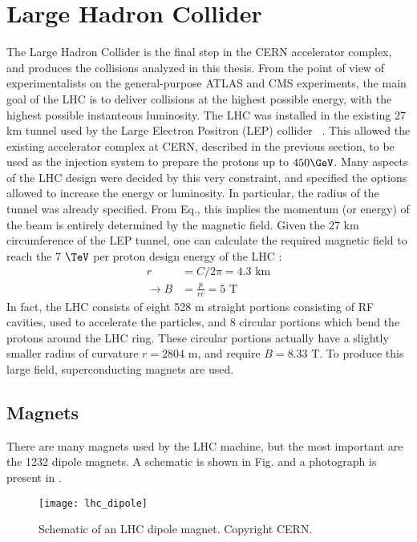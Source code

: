 \section{Large Hadron Collider}

The Large Hadron Collider is the final step in the CERN accelerator complex, and produces the collisions analyzed in this thesis.
From the point of view of experimentalists on the general-purpose ATLAS and CMS experiments, the main goal of the LHC is to deliver collisions at the highest possible energy, with the highest possible instanteous luminosity.
The LHC was installed in the existing 27 km tunnel used by the Large Electron Positron (LEP) collider ~\cite{lepDesign}.
This allowed the existing accelerator complex at CERN, described in the previous section, to be used as the injection system to prepare the protons up to $450 \GeV$.
Many aspects of the LHC design were decided by this very constraint, and specified the options allowed to increase the energy or luminosity.
In particular, the radius of the tunnel was already specified.
From Eq., this implies the momentum (or energy) of the beam is entirely determined by the magnetic field.
Given the 27 km circumference of the LEP tunnel, one can calculate the required magnetic field to reach the 7 $\TeV$ per proton design energy of the LHC :
\begin{align}
r &= C / 2\pi = 4.3 \text{ km} \\
\rightarrow B &= \frac{p}{rc} = 5 \text{ T}
\end{align}
In fact, the LHC consists of eight 528 m straight portions consisting of RF cavities, used to accelerate the particles, and 8 circular portions which bend the protons around the LHC ring.
These circular portions actually have a slightly smaller radius of curvature $r = 2804 $ m, and require $B = 8.33 \text{ T}$.
To produce this large field, superconducting magnets are used.

\subsection{Magnets}

There are many magnets used by the LHC machine, but the most important are the 1232 dipole magnets.
A schematic is shown in Fig. and a photograph is present in .
\begin{figure}
\caption{Schematic of an LHC dipole magnet. Copyright CERN.}\label{fig:dipole_schematic}
\texttt{[image: lhc\_dipole]}
\end{figure}

